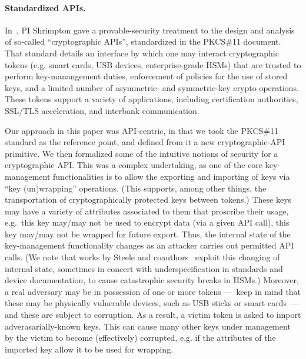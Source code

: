 \paragraph{Standardized APIs. }
In~\cite{SSW}, PI Shrimpton gave a provable-security treatment to the design and
analysis of so-called ``cryptographic APIs'', standardized in the PKCS\#11
document\cite{xxx}.  That standard details an interface by which one may interact
cryptographic tokens (e.g. smart cards, USB devices, enterprise-grade HSMs) that
are trusted to perform key-manangement duties, enforcement of policies for the
use of stored keys, and a limited number of asymmetric- and symmetric-key crypto
operations.  These tokens support a variety of applications, including
certification authorities, SSL/TLS acceleration, and interbank communication.

Our approach in this paper was API-centric, in that we took the PKCS\#11
standard as the reference point, and defined from it a new cryptographic-API
primitive.  We then formalized some of the intuitive notions of security for a
cryptographic API.  This was a complex undertaking, as one of the core
key-management functionalities is to allow the exporting and importing of keys
via ``key (un)wrapping'' operations.  (This supports, among other things, the
transportation of cryptographically protected keys between tokens.)  These keys
may have a variety of attributes associated to them that proscribe
their usage, e.g.\ this key may/may not be used to encrypt data (via a given API
call), this key may/may not be wrapped for future export.  Thus, the internal
state of the key-management functionality changes as an attacker carries out
permitted API calls. (We note that works by Steele and coauthors~\cite{xxx,yyy,zzz} exploit this
changing of internal state, sometimes in concert with underspecification in standards and device documentation,
to cause catastrophic security breaks in HSMs.)
Moreover, a real adversary may be in possession of one or
more tokens ---~keep in mind that these may be physically vulnerable
devices, such as USB sticks or smart cards~--- and these are subject
to corruption.  As a result, a victim token is asked to
import adverasarially-known keys.  This can cause many other keys
under management by the victim to become (effectively) corrupted, 
e.g. if the attributes of the imported key allow it to be used for wrapping.

\begin{task}
\end{task}
%

